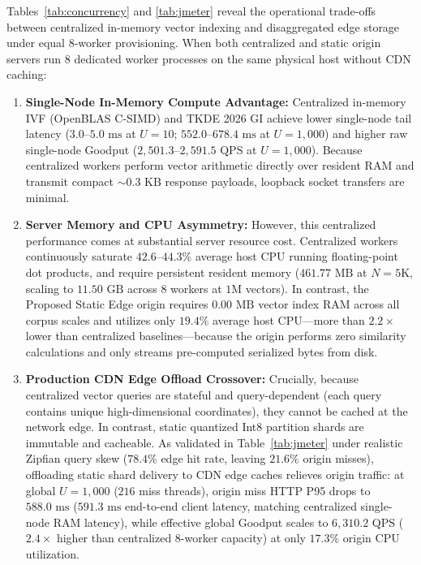 \documentclass[11pt,journal,compsoc,onecolumn]{IEEEtran}
\begin{document}
\vspace{6pt}
Tables~\ref{tab:concurrency} and \ref{tab:jmeter} reveal the operational trade-offs between centralized in-memory vector indexing and disaggregated edge storage under equal 8-worker provisioning. When both centralized and static origin servers run 8 dedicated worker processes on the same physical host without CDN caching:
\begin{enumerate}
    \item \textbf{Single-Node In-Memory Compute Advantage:} Centralized in-memory IVF (OpenBLAS C-SIMD) and TKDE 2026 GI achieve lower single-node tail latency ($3.0\text{--}5.0\text{ ms}$ at $U=10$; $552.0\text{--}678.4\text{ ms}$ at $U=1,000$) and higher raw single-node Goodput ($2,501.3\text{--}2,591.5\text{ QPS}$ at $U=1,000$). Because centralized workers perform vector arithmetic directly over resident RAM and transmit compact $\sim 0.3\text{ KB}$ response payloads, loopback socket transfers are minimal.
    \item \textbf{Server Memory and CPU Asymmetry:} However, this centralized performance comes at substantial server resource cost. Centralized workers continuously saturate $42.6\text{--}44.3\%$ average host CPU running floating-point dot products, and require persistent resident memory ($461.77\text{ MB}$ at $N=5\text{K}$, scaling to $11.50\text{ GB}$ across 8 workers at $1\text{M}$ vectors). In contrast, the Proposed Static Edge origin requires $0.00\text{ MB}$ vector index RAM across all corpus scales and utilizes only $19.4\%$ average host CPU---more than $2.2\times$ lower than centralized baselines---because the origin performs zero similarity calculations and only streams pre-computed serialized bytes from disk.
    \item \textbf{Production CDN Edge Offload Crossover:} Crucially, because centralized vector queries are stateful and query-dependent (each query contains unique high-dimensional coordinates), they cannot be cached at the network edge. In contrast, static quantized Int8 partition shards are immutable and cacheable. As validated in Table~\ref{tab:jmeter} under realistic Zipfian query skew ($78.4\%$ edge hit rate, leaving $21.6\%$ origin misses), offloading static shard delivery to CDN edge caches relieves origin traffic: at global $U=1,000$ ($216$ miss threads), origin miss HTTP P95 drops to $588.0\text{ ms}$ ($591.3\text{ ms}$ end-to-end client latency, matching centralized single-node RAM latency), while effective global Goodput scales to $6,310.2\text{ QPS}$ ($2.4\times$ higher than centralized 8-worker capacity) at only $17.3\%$ origin CPU utilization.
\end{enumerate}
\end{document}
